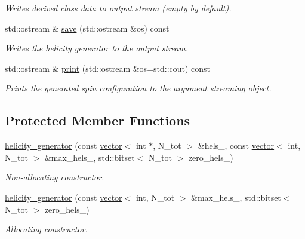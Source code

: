 \begin{DoxyCompactItemize}
\begin{DoxyCompactList}\small\item\em Writes derived class data to output stream (empty by default). \end{DoxyCompactList}\item 
\hypertarget{a00267_abe73b89394ec84e1d4bcb8bfcee9a09d}{std\-::ostream \& \hyperlink{a00267_abe73b89394ec84e1d4bcb8bfcee9a09d}{save} (std\-::ostream \&os) const }\label{a00267_abe73b89394ec84e1d4bcb8bfcee9a09d}

\begin{DoxyCompactList}\small\item\em Writes the helicity generator to the output stream. \end{DoxyCompactList}\item 
std\-::ostream \& \hyperlink{a00267_a55f9f3fdf26128fe54e9eec4ac4de750}{print} (std\-::ostream \&os=std\-::cout) const 
\begin{DoxyCompactList}\small\item\em Prints the generated spin configuration to the argument streaming object. \end{DoxyCompactList}\end{DoxyCompactItemize}
\subsection*{Protected Member Functions}
\begin{DoxyCompactItemize}
\item 
\hyperlink{a00267_a7a9e24ee4ac64da2657523792729c8b1}{helicity\-\_\-generator} (const \hyperlink{a00559}{vector}$<$ int $\ast$, N\-\_\-tot $>$ \&hels\-\_\-, const \hyperlink{a00559}{vector}$<$ int, N\-\_\-tot $>$ \&max\-\_\-hels\-\_\-, std\-::bitset$<$ N\-\_\-tot $>$ zero\-\_\-hels\-\_\-)
\begin{DoxyCompactList}\small\item\em Non-\/allocating constructor. \end{DoxyCompactList}\item 
\hyperlink{a00267_a88704ef647b316ee8b893df31b64035a}{helicity\-\_\-generator} (const \hyperlink{a00559}{vector}$<$ int, N\-\_\-tot $>$ \&max\-\_\-hels\-\_\-, std\-::bitset$<$ N\-\_\-tot $>$ zero\-\_\-hels\-\_\-)
\begin{DoxyCompactList}\small\item\em Allocating constructor. \end{DoxyCompactList}\end{DoxyCompactItemize}
